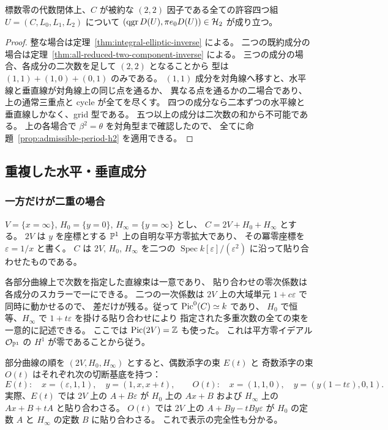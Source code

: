 \begin{theorem}
\label{thm:all-reduced-inverse}
標数零の代数閉体上、$C$ が被約な $(2,2)$ 因子である全ての許容四つ組
$U=(C,L_0,L_1,L_2)$ について
$(\operatorname{qgr} D(U),\pi e_0D(U))\in\mathcal H_2$ が成り立つ。
\end{theorem}

\begin{proof}
整な場合は定理~\ref{thm:integral-elliptic-inverse} による。
二つの既約成分の場合は定理~\ref{thm:all-reduced-two-component-inverse} による。
三つの成分の場合、各成分の二次数を足して $(2,2)$ となることから
型は $(1,1)+(1,0)+(0,1)$ のみである。
$(1,1)$ 成分を対角線へ移すと、水平線と垂直線が対角線上の同じ点を通るか、
異なる点を通るかの二場合であり、上の通常三重点と cycle が全てを尽くす。
四つの成分なら二本ずつの水平線と垂直線しかなく、grid 型である。
五つ以上の成分は二次数の和から不可能である。
上の各場合で $\beta^2=\theta$ を対角型まで確認したので、
全てに命題~\ref{prop:admissible-period-h2} を適用できる。
\end{proof}

\subsection{重複した水平・垂直成分}

\subsubsection{一方だけが二重の場合}

$V=\{x=\infty\}$, $H_0=\{y=0\}$, $H_\infty=\{y=\infty\}$ とし、
$C=2V+H_0+H_\infty$ とする。
$2V$ は $y$ を座標とする $\mathbb P^1$ 上の自明な平方零拡大であり、
その冪零座標を $\varepsilon=1/x$ と書く。
$C$ は $2V$, $H_0$, $H_\infty$ を二つの
$\operatorname{Spec}k[\varepsilon]/(\varepsilon^2)$ に沿って貼り合わせたものである。

各部分曲線上で次数を指定した直線束は一意であり、
貼り合わせの零次係数は各成分のスカラーで一にできる。
二つの一次係数は $2V$ 上の大域単元 $1+c\varepsilon$ で同時に動かせるので、
差だけが残る。従って $\operatorname{Pic}^0(C)\simeq k$ であり、
$H_0$ で恒等、$H_\infty$ で $1+t\varepsilon$ を掛ける貼り合わせにより
指定された多重次数の全ての束を一意的に記述できる。
ここでは $\operatorname{Pic}(2V)=\mathbb Z$ も使った。
これは平方零イデアル $\mathcal O_{\mathbb P^1}$ の $H^1$ が零であることから従う。

部分曲線の順を $(2V,H_0,H_\infty)$ とすると、偶数添字の束 $E(t)$ と
奇数添字の束 $O(t)$ はそれぞれ次の切断基底を持つ：
\[
 E(t):\quad x=(\varepsilon,1,1),\quad y=(1,x,x+t),
 \qquad
 O(t):\quad x=(1,1,0),\quad y=(y(1-t\varepsilon),0,1).
\]
実際、$E(t)$ では $2V$ 上の $A+B\varepsilon$ が
$H_0$ 上の $Ax+B$ および $H_\infty$ 上の $Ax+B+tA$ と貼り合わさる。
$O(t)$ では $2V$ 上の
$A+B y-t B y\varepsilon$ が $H_0$ の定数 $A$ と
$H_\infty$ の定数 $B$ に貼り合わさる。
これで表示の完全性も分かる。

